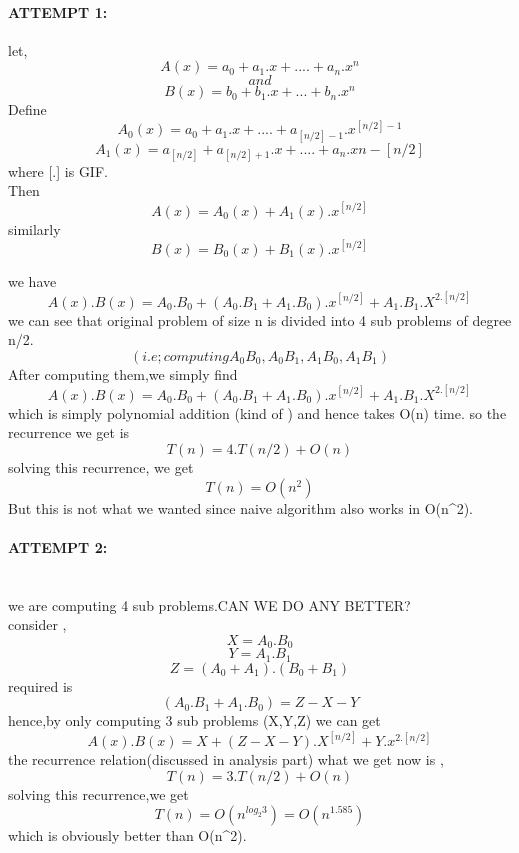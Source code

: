 \documentclass[10pt]{article}
\begin{document}
\paragraph{ATTEMPT 1:}


let,
\[A(x)=a_0+a_1.x+....+a_n.x^n \]  \[and\]   \[B(x)=b_0+b_1.x+...+b_n.x^n\]
Define
\[A_0(x)=a_0+a_1.x+  ....  +a_{[n/2]-1}.x^{[n/2]-1}\]
\[A_1(x)=a_{[n/2]}+a_{[n/2]+1}.x+  ....  +a_n.x{n-[n/2]}\] where  [.]  is  GIF.\\

Then
\[A(x)=A_0(x)+A_1(x).x^{[n/2]}\]
similarly
\[B(x)=B_0(x)+B_1(x).x^{[n/2]}\]

we have \[A(x).B(x)=A_0.B_0+(A_0.B_1+A_1.B_0).x^{[n/2]}+A_1.B_1.X^{2.[n/2]}\]
we can see that original problem of size n is divided into 4 sub problems  of degree n/2.\[ (i.e; computing  A_0B_0 , A_0B_1 , A_1B_0 , A_1B_1)\]
After computing them,we simply find\\
\[A(x).B(x)=A_0.B_0+(A_0.B_1+A_1.B_0).x^{[n/2]}+A_1.B_1.X^{2.[n/2]}\]
which is simply  polynomial addition (kind of ) and hence takes O(n) time.
so the recurrence we get is \\
\[T(n)=4.T(n/2)+O(n)\]
solving this recurrence, we get \[T(n)=O(n^2)\]
But this is not what we wanted since naive algorithm also works in O(n^2).\\

\paragraph{ATTEMPT 2:}\\
we are computing 4 sub problems.CAN WE DO ANY BETTER?\\
consider ,\\
\[X=A_0.B_0\]
\[Y=A_1.B_1\]
\[Z=(A_0+A_1).(B_0+B_1)\]
required is\[ (A_0.B_1+A_1.B_0)=Z-X-Y\]
hence,by only computing 3 sub problems (X,Y,Z) we can get \\
\[A(x).B(x)=X+(Z-X-Y).X^{[n/2]}+Y.x^{2.[n/2]}\]
the recurrence relation(discussed in analysis part) what we get now is ,\\
\[T(n)=3.T(n/2)+O(n)\]
solving this recurrence,we get
\[T(n)=O(n^{log_2 3})=O(n^{1.585})\]
which is obviously better than O(n^2).
\fi

\end{document}
